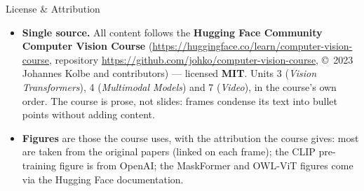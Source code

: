 \begin{frame}{License \& Attribution}
\begin{itemize}
\item \textbf{Single source.} All content follows the \textbf{Hugging Face Community Computer Vision Course} (\url{https://huggingface.co/learn/computer-vision-course}, repository \url{https://github.com/johko/computer-vision-course}, \copyright\ 2023 Johannes Kolbe and contributors) --- licensed \textbf{MIT}. Units 3 (\textit{Vision Transformers}), 4 (\textit{Multimodal Models}) and 7 (\textit{Video}), in the course's own order. The course is prose, not slides: frames condense its text into bullet points without adding content.
\item \textbf{Figures} are those the course uses, with the attribution the course gives: most are taken from the original papers (linked on each frame); the CLIP pre-training figure is from OpenAI; the MaskFormer and OWL-ViT figures come via the Hugging Face documentation.
\end{itemize}
\end{frame}

\endlecture

